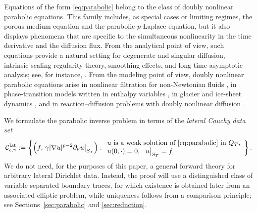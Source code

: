 \documentclass[a4paper,12pt]{article}
\theoremstyle{definition}
\theoremstyle{remark}
\begin{document}
Equations of the form \eqref{eq:parabolic} belong to the class of doubly nonlinear parabolic equations. This family includes, as special cases or limiting regimes, the porous medium equation and the parabolic $p$-Laplace equation, but it also displays phenomena that are specific to the simultaneous nonlinearity in the time derivative and the diffusion flux. From the analytical point of view, such equations provide a natural setting for degenerate and singular diffusion, intrinsic-scaling regularity theory, smoothing effects, and long-time asymptotic analysis; see, for instance, \cite{PorVes,BoDuMaSche-ARMA,BonGri,StanVaz}. From the modeling point of view, doubly nonlinear parabolic equations arise in nonlinear filtration for non-Newtonian fluids \cite{OtSu}, in phase-transition models written in enthalpy variables \cite{Visintin}, in glacier and ice-sheet dynamics \cite{GreBl}, and in reaction--diffusion problems with doubly nonlinear diffusion \cite{AudVaz}. 

We formulate the parabolic inverse problem in terms of the \emph{lateral Cauchy data set}
\begin{equation}\label{eq:intro-cauchy}
\mathcal C^{\mathrm{lat}}_{\epsilon,\gamma}
:=\left\{\left(f,\,\gamma|\nabla u|^{p-2}\partial_\nu u\big|_{S_T}\right):
\begin{array}{l}
 u \text{ is a weak solution of \eqref{eq:parabolic} in }Q_T,\\
 u(0,\cdot)=0,\ \ u\big|_{S_T}=f
\end{array}
\right\}.
\end{equation}
 We do not need, for the purposes of this paper, a general forward theory for arbitrary lateral Dirichlet data. Instead, the proof will use a distinguished class of variable separated boundary traces, for which existence is obtained later from an associated elliptic problem, while uniqueness follows from a comparison principle; see Sections~\ref{sec:parabolic} and \ref{sec:reduction}.
\end{document}
